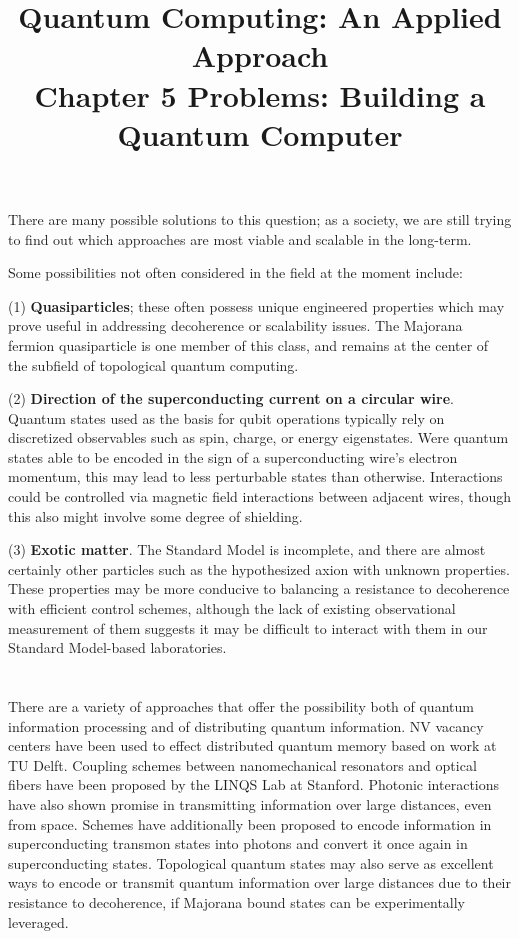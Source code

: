 \documentclass{article}
\date{}
\title{\textbf{Quantum Computing: An Applied Approach}\\\vspace*{1cm}
Chapter 5 Problems: Building a Quantum Computer
}
\begin{document}
\maketitle

\section{}

There are many possible solutions to this question; as a society, we are still trying to find out which approaches are most viable and scalable in the long-term.

Some possibilities not often considered in the field at the moment include:\newline

(1) \textbf{Quasiparticles}; these often possess unique engineered properties which may prove useful in addressing decoherence or scalability issues. The Majorana fermion quasiparticle is one member of this class, and remains at the center of the subfield of topological quantum computing.\newline

(2) \textbf{Direction of the superconducting current on a circular wire}. Quantum states used as the basis for qubit operations typically rely on discretized observables such as spin, charge, or energy eigenstates. Were quantum states able to be encoded in the sign of a superconducting wire's electron momentum, this may lead to less perturbable states than otherwise. Interactions could be controlled via magnetic field interactions between adjacent wires, though this also might involve some degree of shielding.\newline

(3) \textbf{Exotic matter}. The Standard Model is incomplete, and there are almost certainly other particles such as the hypothesized axion with unknown properties. These properties may be more conducive to balancing a resistance to decoherence with efficient control schemes, although the lack of existing observational measurement of them suggests it may be difficult to interact with them in our Standard Model-based laboratories.

\section{}

There are a variety of approaches that offer the possibility both of quantum information processing and of distributing quantum information. NV vacancy centers have been used to effect distributed quantum memory based on work at TU Delft. Coupling schemes between nanomechanical resonators and optical fibers have been proposed by the LINQS Lab at Stanford. Photonic interactions have also shown promise in transmitting information over large distances, even from space. Schemes have additionally been proposed to encode information in superconducting transmon states into photons and convert it once again in superconducting states. Topological quantum states may also serve as excellent ways to encode or transmit quantum information over large distances due to their resistance to decoherence, if Majorana bound states can be experimentally leveraged.
\end{document}
